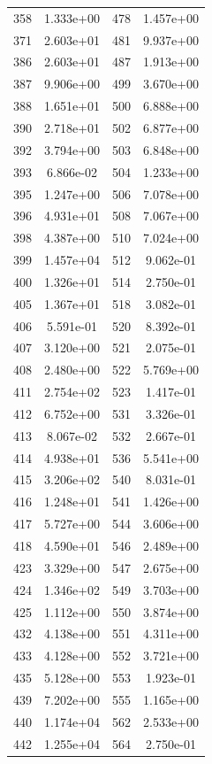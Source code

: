 \documentclass[12pt]{article}
\begin{document}
\begin{longtable}{@{}cccc@{}}
358 & 1.333e+00 & 478 & 1.457e+00 \\
371 & 2.603e+01 & 481 & 9.937e+00 \\
386 & 2.603e+01 & 487 & 1.913e+00 \\
387 & 9.906e+00 & 499 & 3.670e+00 \\
388 & 1.651e+01 & 500 & 6.888e+00 \\
390 & 2.718e+01 & 502 & 6.877e+00 \\
392 & 3.794e+00 & 503 & 6.848e+00 \\
393 & 6.866e-02 & 504 & 1.233e+00 \\
395 & 1.247e+00 & 506 & 7.078e+00 \\
396 & 4.931e+01 & 508 & 7.067e+00 \\
398 & 4.387e+00 & 510 & 7.024e+00 \\
399 & 1.457e+04 & 512 & 9.062e-01 \\
400 & 1.326e+01 & 514 & 2.750e-01 \\
405 & 1.367e+01 & 518 & 3.082e-01 \\
406 & 5.591e-01 & 520 & 8.392e-01 \\
407 & 3.120e+00 & 521 & 2.075e-01 \\
408 & 2.480e+00 & 522 & 5.769e+00 \\
411 & 2.754e+02 & 523 & 1.417e-01 \\
412 & 6.752e+00 & 531 & 3.326e-01 \\
413 & 8.067e-02 & 532 & 2.667e-01 \\
414 & 4.938e+01 & 536 & 5.541e+00 \\
415 & 3.206e+02 & 540 & 8.031e-01 \\
416 & 1.248e+01 & 541 & 1.426e+00 \\
417 & 5.727e+00 & 544 & 3.606e+00 \\
418 & 4.590e+01 & 546 & 2.489e+00 \\
423 & 3.329e+00 & 547 & 2.675e+00 \\
424 & 1.346e+02 & 549 & 3.703e+00 \\
425 & 1.112e+00 & 550 & 3.874e+00 \\
432 & 4.138e+00 & 551 & 4.311e+00 \\
433 & 4.128e+00 & 552 & 3.721e+00 \\
435 & 5.128e+00 & 553 & 1.923e-01 \\
439 & 7.202e+00 & 555 & 1.165e+00 \\
440 & 1.174e+04 & 562 & 2.533e+00 \\
442 & 1.255e+04 & 564 & 2.750e-01 \\

\end{longtable}
\end{document}
